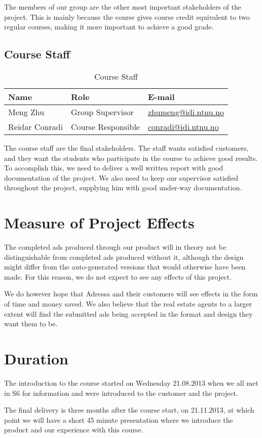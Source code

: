 The members of our group are the other most important stakeholders of the project. This is mainly because the course gives course credit equivalent to two regular courses, making it more important to achieve a good grade.

\subsection{Course Staff}
\begin{table}[H]
\begin{tabular}{|p{4cm}|p{4cm}|p{5cm}|}
\hline
\textbf{Name} & \textbf{Role} & \textbf{E-mail} \\
\hline
Meng Zhu & Group Supervisor & \href{mailto://zhumeng@idi.ntnu.no}{zhumeng@idi.ntnu.no}\\
Reidar Conradi & Course Responsible & \href{mailto://conradi@idi.ntnu.no}{conradi@idi.ntnu.no}\\
\hline
\end{tabular}
\caption{Course Staff}
\end{table}

The course staff are the final stakeholders. The staff wants satisfied customers, and they want the students who participate in the course to achieve good results. To accomplish this, we need to deliver a well written report with good documentation of the project. We also need to keep our supervisor satisfied throughout the project, supplying him with good under-way documentation.

\section{Measure of Project Effects}
The completed ads produced through our product will in theory not be distinguishable from completed ads produced without it, although the design might differ from the auto-generated versions that would otherwise have been made. For this reason, we do not expect to see any effects of this project.

We do however hope that Adressa and their customers will see effects in the form of time and money saved. We also believe that the real estate agents to a larger extent will find the submitted ads being accepted in the format and design they want them to be.

\section{Duration}
The introduction to the course started on Wednesday 21.08.2013 when we all met in S6 for information and were introduced to the customer and the project.

The final delivery is three months after the course start, on 21.11.2013, at which point we will have a short 45 minute presentation where we introduce the product and our experience with this course.